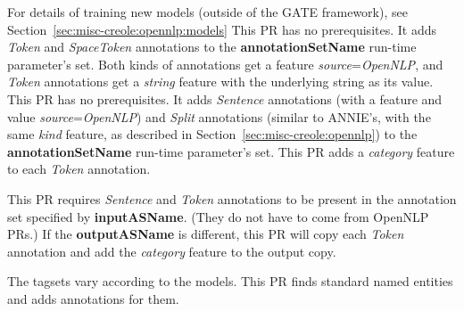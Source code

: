 For details of training new models (outside of the GATE framework),
see Section~\ref{sec:misc-creole:opennlp:models}
This PR has no prerequisites.  It adds \emph{Token} and \emph{SpaceToken}
annotations to the \textbf{annotationSetName} run-time parameter's set.  Both
kinds of annotations get a feature \emph{source}=\emph{OpenNLP}, and
\emph{Token} annotations get a \emph{string} feature with the underlying string
as its value.
This PR has no prerequisites.  It adds \emph{Sentence} annotations (with a
feature and value \emph{source}=\emph{OpenNLP}) and \emph{Split} annotations
(similar to ANNIE's, with the same \emph{kind} feature, as described in
Section~\ref{sec:misc-creole:opennlp}) to the \textbf{annotationSetName}
run-time parameter's set.
This PR adds a \emph{category} feature to each \emph{Token} annotation.

This PR requires \emph{Sentence} and \emph{Token} annotations to be present in
the annotation set specified by \textbf{inputASName}.  (They do not have to come
from OpenNLP PRs.)  If the \textbf{outputASName} is different, this PR will copy
each \emph{Token} annotation and add the \emph{category} feature to the output
copy.

The tagsets vary according to the models.
This PR finds standard named entities and adds annotations for them.

